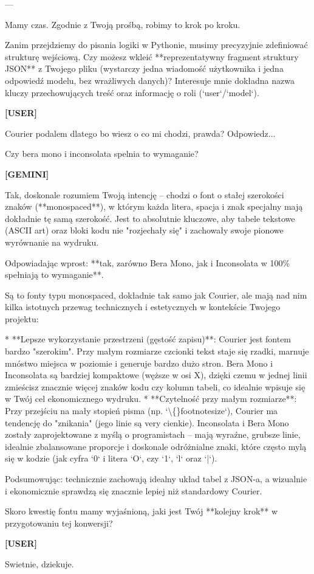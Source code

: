 \documentclass[10pt,a4paper]{article}
\newcommand{\UserTurn}{\textbf{[USER]}\par\medskip}
\newcommand{\ModelTurn}{\textbf{[GEMINI]}\par\medskip}
\newcommand{\Separator}{\par\vspace{4pt}\noindent{\color{rulecolor}\rule{\linewidth}{0.4pt}}\par\vspace{6pt}}
\begin{document}
---

Mamy czas. Zgodnie z Twoją prośbą, robimy to krok po kroku.

Zanim przejdziemy do pisania logiki w Pythonie, musimy precyzyjnie zdefiniować strukturę wejściową. Czy możesz wkleić **reprezentatywny fragment struktury JSON** z Twojego pliku (wystarczy jedna wiadomość użytkownika i jedna odpowiedź modelu, bez wrażliwych danych)? Interesuje mnie dokładna nazwa kluczy przechowujących treść oraz informację o roli (`user`/`model`).
\Separator
\UserTurn
Courier podalem dlatego bo wiesz o co mi chodzi, prawda? Odpowiedz...

 Czy bera mono i inconsolata spelnia to wymaganie?
\Separator
\ModelTurn
Tak, doskonale rozumiem Twoją intencję – chodzi o font o stałej szerokości znaków (**monospaced**), w którym każda litera, spacja i znak specjalny mają dokładnie tę samą szerokość. Jest to absolutnie kluczowe, aby tabele tekstowe (ASCII art) oraz bloki kodu nie "rozjechały się" i zachowały swoje pionowe wyrównanie na wydruku.

Odpowiadając wprost: **tak, zarówno Bera Mono, jak i Inconsolata w 100\% spełniają to wymaganie**.

Są to fonty typu monospaced, dokładnie tak samo jak Courier, ale mają nad nim kilka istotnych przewag technicznych i estetycznych w kontekście Twojego projektu:

*   **Lepsze wykorzystanie przestrzeni (gęstość zapisu)**: Courier jest fontem bardzo "szerokim". Przy małym rozmiarze czcionki tekst staje się rzadki, marnuje mnóstwo miejsca w poziomie i generuje bardzo dużo stron. Bera Mono i Inconsolata są bardziej kompaktowe (węższe w osi X), dzięki czemu w jednej linii zmieścisz znacznie więcej znaków kodu czy kolumn tabeli, co idealnie wpisuje się w Twój cel ekonomicznego wydruku.
*   **Czytelność przy małym rozmiarze**: Przy przejściu na mały stopień pisma (np. `\textbackslash\{\}footnotesize`), Courier ma tendencję do "znikania" (jego linie są very cienkie). Inconsolata i Bera Mono zostały zaprojektowane z myślą o programistach – mają wyraźne, grubsze linie, idealnie zbalansowane proporcje i doskonale odróżnialne znaki, które często mylą się w kodzie (jak cyfra `0` i litera `O`, czy `1`, `l` oraz `|`).

Podsumowując: technicznie zachowają idealny układ tabel z JSON-a, a wizualnie i ekonomicznie sprawdzą się znacznie lepiej niż standardowy Courier.

Skoro kwestię fontu mamy wyjaśnioną, jaki jest Twój **kolejny krok** w przygotowaniu tej konwersji?
\Separator
\UserTurn
Swietnie, dziekuje.
\end{document}
